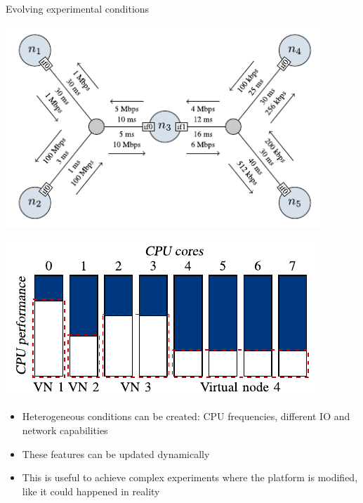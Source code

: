 \documentclass[11pt,xcolor=dvipsnames,presentation]{beamer}
\begin{document}
\begin{frame}[label=sec-3-0-5]{Evolving experimental conditions}

\begin{minipage}{0.5\textwidth}
\begin{center}
    \includegraphics[width=0.9\textwidth]{figures/links}
\end{center}\end{minipage}\hfill
\begin{minipage}{0.5\textwidth}
\begin{center}
    \includegraphics[width=\textwidth]{figures/procs}
\end{center}\end{minipage}

\begin{itemize}
\item Heterogeneous conditions can be created: CPU frequencies,
different IO and network capabilities

\item These features can be updated dynamically

\item This is useful to achieve complex experiments where the platform is modified,
like it could happened in reality
\end{itemize}
\end{frame}
\end{document}
